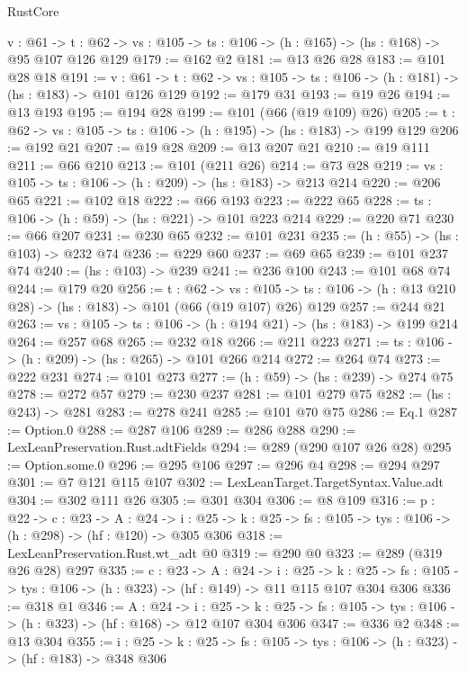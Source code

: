 \begin{lexlean}{RustCore}
\begin{coremodule}
  {v : @61} ->
  {t : @62} -> {vs : @105} -> {ts : @106} -> (h : @165) -> (hs : @168) -> @95 @107 @126 @129
@179 := @162 @2
@181 := @13 @26 @28
@183 := @101 @28 @18
@191 := {v : @61} ->
  {t : @62} -> {vs : @105} -> {ts : @106} -> (h : @181) -> (hs : @183) -> @101 @126 @129
@192 := @179 @31
@193 := @19 @26
@194 := @13 @193
@195 := @194 @28
@199 := @101 (@66 (@19 @109) @26)
@205 := {t : @62} -> {vs : @105} -> {ts : @106} -> (h : @195) -> (hs : @183) -> @199 @129
@206 := @192 @21
@207 := @19 @28
@209 := @13 @207 @21
@210 := @19 @111
@211 := @66 @210
@213 := @101 (@211 @26)
@214 := @73 @28
@219 := {vs : @105} -> {ts : @106} -> (h : @209) -> (hs : @183) -> @213 @214
@220 := @206 @65
@221 := @102 @18
@222 := @66 @193
@223 := @222 @65
@228 := {ts : @106} -> (h : @59) -> (hs : @221) -> @101 @223 @214
@229 := @220 @71
@230 := @66 @207
@231 := @230 @65
@232 := @101 @231
@235 := (h : @55) -> (hs : @103) -> @232 @74
@236 := @229 @60
@237 := @69 @65
@239 := @101 @237 @74
@240 := (hs : @103) -> @239
@241 := @236 @100
@243 := @101 @68 @74
@244 := @179 @20
@256 := {t : @62} ->
  {vs : @105} -> {ts : @106} -> (h : @13 @210 @28) -> (hs : @183) -> @101 (@66 (@19 @107) @26) @129
@257 := @244 @21
@263 := {vs : @105} -> {ts : @106} -> (h : @194 @21) -> (hs : @183) -> @199 @214
@264 := @257 @68
@265 := @232 @18
@266 := @211 @223
@271 := {ts : @106} -> (h : @209) -> (hs : @265) -> @101 @266 @214
@272 := @264 @74
@273 := @222 @231
@274 := @101 @273
@277 := (h : @59) -> (hs : @239) -> @274 @75
@278 := @272 @57
@279 := @230 @237
@281 := @101 @279 @75
@282 := (hs : @243) -> @281
@283 := @278 @241
@285 := @101 @70 @75
@286 := Eq.{1}
@287 := Option.{0}
@288 := @287 @106
@289 := @286 @288
@290 := LexLeanPreservation.Rust.adtFields
@294 := @289 (@290 @107 @26 @28)
@295 := Option.some.{0}
@296 := @295 @106
@297 := @296 @4
@298 := @294 @297
@301 := @7 @121 @115 @107
@302 := LexLeanTarget.TargetSyntax.Value.adt
@304 := @302 @111 @26
@305 := @301 @304
@306 := @8 @109
@316 := {p : @22} ->
  {c : @23} ->
  {A : @24} ->
  {i : @25} -> {k : @25} -> {fs : @105} -> {tys : @106} -> (h : @298) -> (hf : @120) -> @305 @306
@318 := LexLeanPreservation.Rust.wt_adt @0
@319 := @290 @0
@323 := @289 (@319 @26 @28) @297
@335 := {c : @23} ->
  {A : @24} ->
  {i : @25} ->
  {k : @25} -> {fs : @105} -> {tys : @106} -> (h : @323) -> (hf : @149) -> @11 @115 @107 @304 @306
@336 := @318 @1
@346 := {A : @24} ->
  {i : @25} ->
  {k : @25} -> {fs : @105} -> {tys : @106} -> (h : @323) -> (hf : @168) -> @12 @107 @304 @306
@347 := @336 @2
@348 := @13 @304
@355 := {i : @25} ->
  {k : @25} -> {fs : @105} -> {tys : @106} -> (h : @323) -> (hf : @183) -> @348 @306

\end{coremodule}
\end{lexlean}

